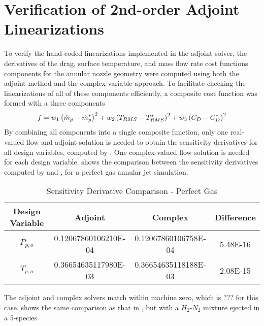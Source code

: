 \section{Verification of 2nd-order Adjoint Linearizations}

To verify the hand-coded linearizations implemented in the adjoint solver, the
derivatives of the drag, surface temperature, and mass flow rate cost functions
components for the annular nozzle geometry were computed using both the adjoint
method and the complex-variable approach.  To facilitate checking the
linearizations of all of these components efficiently, a composite cost function
was formed with a three components
\begin{equation}
  f = w_1\left( \dot{m}_p - \dot{m}_p^{*}\right)^{2}
  + w_2\left( T_{RMS} - T_{RMS}^*\right)^2
  + w_3\left( C_{D} - C_{D}^*\right)^2
  \label{check-cost-func}
\end{equation}
By combining all components into a single composite function, only one
real-valued flow and adjoint solution is needed to obtain the sensitivity
derivatives for all design variables, computed by . One
complex-valued flow solution is needed for each design variable.
 shows the comparison between the sensitivity
derivatives computed by  and , for a
perfect gas annular jet simulation.
\begin{table}[h]
  \centering
  \begin{tabular}{c|c|c|c}
    Design Variable & Adjoint & Complex & Difference\\
    \hline
    $P_{p,o}$ & 0.12067860106210E-04 & 0.12067860106758E-04 & 5.48E-16 \\
    $T_{p,o}$ & 0.36654635117980E-03 & 0.36654635118188E-03 & 2.08E-15
  \end{tabular}
  \caption{Sensitivity Derivative Comparison - Perfect Gas}
  \label{tab:pg-deriv-check}
\end{table}
The adjoint and complex solvers match within machine zero, which is ??? for this
case.   shows the same comparison as that in
, but with a $H_2$-$N_2$ mixture ejected in a 5-species
